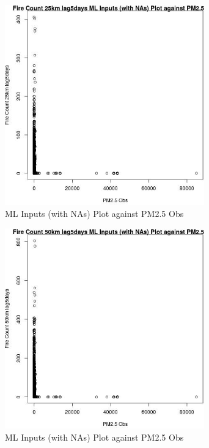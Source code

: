 \begin{figure} 
\centering  
\includegraphics[width=0.77\textwidth]{Code_Outputs/Report_ML_input_PM25_Step4_part_f_de_duplicated_aveswNAs_Fire_Count_25km_lag5daysvPM25_Obs.jpg} 
\caption{\label{fig:Report_ML_input_PM25_Step4_part_f_de_duplicated_aveswNAsFire_Count_25km_lag5daysvPM25_Obs}ML Inputs (with NAs) Plot against PM2.5 Obs} 
\end{figure} 
 

\begin{figure} 
\centering  
\includegraphics[width=0.77\textwidth]{Code_Outputs/Report_ML_input_PM25_Step4_part_f_de_duplicated_aveswNAs_Fire_Count_50km_lag5daysvPM25_Obs.jpg} 
\caption{\label{fig:Report_ML_input_PM25_Step4_part_f_de_duplicated_aveswNAsFire_Count_50km_lag5daysvPM25_Obs}ML Inputs (with NAs) Plot against PM2.5 Obs} 
\end{figure} 
 

